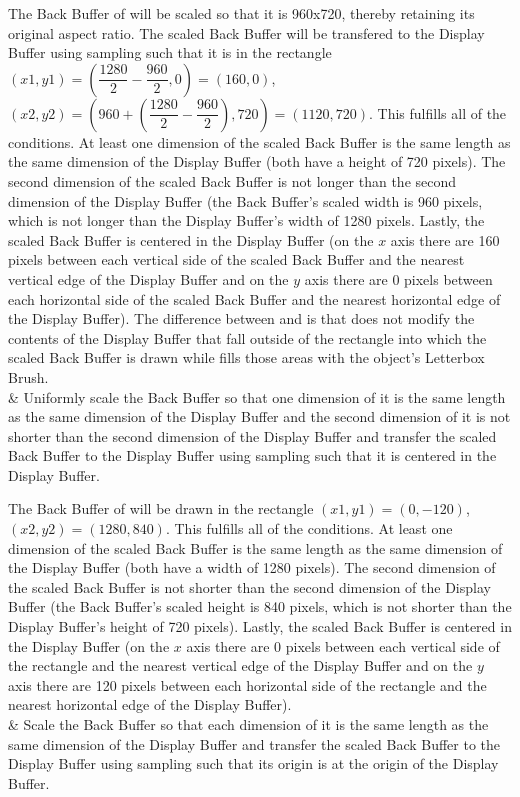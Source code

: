 \begin{libreqtab2}
 \enterexample
 The Back Buffer of  will be scaled so that it is 960x720, thereby retaining its original aspect ratio. The scaled Back Buffer will be transfered to the Display Buffer using sampling such that it is in the rectangle $(x1,y1) = (\dfrac{1280}{2} - \dfrac{960}{2},0) = (160,0)$, $(x2,y2) = (960 + (\dfrac{1280}{2} - \dfrac{960}{2}),720) = (1120,720)$. This fulfills all of the conditions. At least one dimension of the scaled Back Buffer is the same length as the same dimension of the Display Buffer (both have a height of 720 pixels). The second dimension of the scaled Back Buffer is not longer than the second dimension of the Display Buffer (the Back Buffer's scaled width is 960 pixels, which is not longer than the Display Buffer's width of 1280 pixels. Lastly, the scaled Back Buffer is centered in the Display Buffer (on the $x$ axis there are 160 pixels between each vertical side of the scaled Back Buffer and the nearest vertical edge of the Display Buffer and on the $y$ axis there are 0 pixels between each horizontal side of the scaled Back Buffer and the nearest horizontal edge of the Display Buffer).
 \exitexample
 \enternote
 The difference between  and  is that  does not modify the contents of the Display Buffer that fall outside of the rectangle into which the scaled Back Buffer is drawn while  fills those areas with the  object's Letterbox Brush.
 \exitnote
 \\
 & Uniformly scale the Back Buffer so that one dimension of it is the same length as the same dimension of the Display Buffer and the second dimension of it is not shorter than the second dimension of the Display Buffer and transfer the scaled Back Buffer to the Display Buffer using sampling such that it is centered in the Display Buffer.
 
 \enterexample
 The Back Buffer of  will be drawn in the rectangle $(x1,y1) = (0,-120)$, $(x2,y2) = (1280,840)$. This fulfills all of the conditions. At least one dimension of the scaled Back Buffer is the same length as the same dimension of the Display Buffer (both have a width of 1280 pixels). The second dimension of the scaled Back Buffer is not shorter than the second dimension of the Display Buffer (the Back Buffer's scaled height is 840 pixels, which is not shorter than the Display Buffer's height of 720 pixels). Lastly, the scaled Back Buffer is centered in the Display Buffer (on the $x$ axis there are 0 pixels between each vertical side of the rectangle and the nearest vertical edge of the Display Buffer and on the $y$ axis there are 120 pixels between each horizontal side of the rectangle and the nearest horizontal edge of the Display Buffer).
 \exitexample 
 \\
 & Scale the Back Buffer so that each dimension of it is the same length as the same dimension of the Display Buffer and transfer the scaled Back Buffer to the Display Buffer using sampling such that its origin is at the origin of the Display Buffer.
 

\end{libreqtab2}
